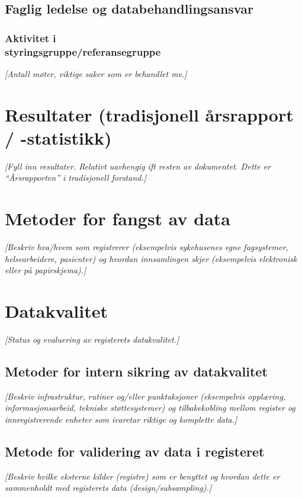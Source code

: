 \documentclass[norsk, a4paper, twocolumn]{report}
\newcommand{\guide}[1] {
	\textit{[\textcolor{guidegray}{#1}]}
	}
\begin{document}
\section{Faglig ledelse og databehandlingsansvar}\label{cha:led}

\subsection{Aktivitet i \\ styringsgruppe/referansegruppe}
\guide{Antall møter, viktige saker som er behandlet mv.}



\chapter{Resultater (tradisjonell årsrapport / -statistikk)}\label{cha:res}
\guide{Fyll inn resultater. Relativt uavhengig ift resten av dokumentet. Dette er ``Årsrapporten'' i tradisjonell forstand.}






\chapter{Metoder for fangst av data}\label{cha:metoder}
\guide{Beskriv hva/hvem som registrerer (eksempelvis sykehusenes egne
fagsystemer, helsearbeidere, pasienter) og hvordan innsamlingen skjer
(eksempelvis elektronisk eller på papirskjema).}




\chapter{Datakvalitet}\label{cha:kva}
\guide{Status og evaluering av registerets  datakvalitet.}

\section{Metoder for intern sikring av datakvalitet}\label{sec:sik}
\guide{Beskriv infrastruktur, rutiner og/eller punktaksjoner (eksempelvis
opplæring, informasjonsarbeid, tekniske støttesystemer) og tilbakekobling mellom register og innregistrerende enheter som ivaretar riktige og
komplette data.}

\section{Metode for validering av data i registeret}\label{sec:metval}
\guide{Beskriv hvilke eksterne kilder (registre) som er benyttet og hvordan
dette er sammenholdt med registerets data (design/subsampling).} 
\end{document}
